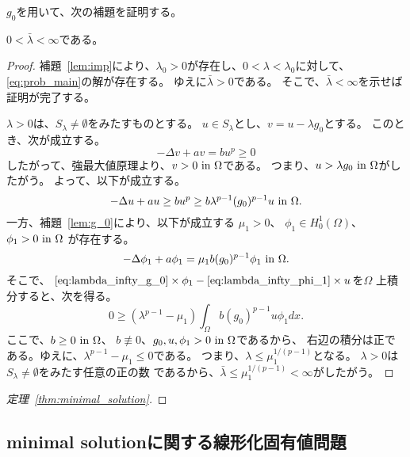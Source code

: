 $g_0$を用いて、次の補題を証明する。

\begin{lem}
 $0 < \bar{\lambda} < \infty$である。
\end{lem}

\begin{proof}
補題~\ref{lem:imp}により、$\lambda_0 > 0$が存在し、$0 < \lambda <
 \lambda_0$に対して、\ref{eq:prob_main}の解が存在する。
ゆえに$\bar{\lambda} > 0$である。
そこで、$\bar{\lambda} < \infty$を示せば証明が完了する。

$\lambda > 0$は、$S_\lambda \neq \emptyset$をみたすものとする。
$u \in S_\lambda$とし、$v = u - \lambda g_0$とする。
このとき、次が成立する。
\[
 -\Delta v + av = bu^p \geq 0
\]
したがって、強最大値原理より、$v > 0 ~\text{in}~ \Omega$である。
つまり、$u > \lambda g_0 ~\text{in}~ \Omega$がしたがう。
よって、以下が成立する。
\begin{equation}
 - \Delta u + au \geq bu^p \geq b \lambda^{p-1} (g_0)^{p-1} u ~\text{in}~
  \Omega. \label{eq:lambda_infty_g_0} 
\end{equation}
一方、補題~\ref{lem:g_0}により、以下が成立する
$\mu_1 > 0$、
$\phi_1 \in H_0^1(\Omega)$、$\phi_1 > 0 ~\text{in}~ \Omega$
が存在する。
\begin{equation}
 -\Delta \phi_1 + a \phi_1 = \mu_1 b (g_0)^{p-1} \phi_1 ~\text{in}~ \Omega. 
  \label{eq:lambda_infty_phi_1} 
\end{equation}
 そこで、
 $\text{\eqref{eq:lambda_infty_g_0}} \times \phi_1 - 
 \text{\eqref{eq:lambda_infty_phi_1}} \times u $を$\Omega$
 上積分すると、次を得る。
 \[
  0 \geq (\lambda^{p-1} - \mu_1) \int_\Omega b(g_0)^{p-1} u \phi_1 dx.
 \]
 ここで、$b \geq 0 ~\text{in}~ \Omega$、
 $b \not \equiv 0$、$g_0, u, \phi_1 > 0 ~\text{in}~ \Omega$であるから、
 右辺の積分は正である。ゆえに、$\lambda^{p-1} - \mu_1 \leq 0$である。
 つまり、$\lambda \leq \mu_1^{1/(p-1)}$となる。
 $\lambda > 0$は$S_\lambda \neq \emptyset$をみたす任意の正の数
 であるから、$\bar{\lambda} \leq \mu_1 ^{1/(p-1)} < \infty$がしたがう。
 \qedhere
\end{proof}

\begin{proof}[定理~\ref{thm:minimal_solution}]
 
\end{proof}

\subsection{minimal solutionに関する線形化固有値問題}

